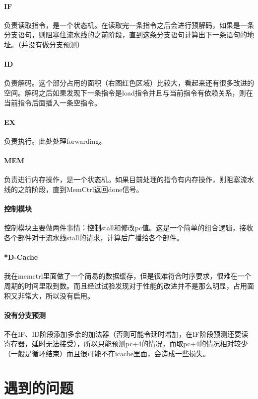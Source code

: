 \documentclass[UTF8]{ctexart}
\begin{document}
	
	\paragraph{IF} 负责读取指令，是一个状态机。在读取完一条指令之后会进行预解码，如果是一条分支语句，则阻塞住流水线的之前阶段，直到这条分支语句计算出下一条语句的地址。（并没有做分支预测）
	
	
	\paragraph{ID} 负责解码。这个部分占用的面积（右图红色区域）比较大，看起来还有很多改进的空间。解码之后如果发现下一条指令是load指令并且与当前指令有依赖关系，则在当前指令后面插入一条空指令。
	

	
	\paragraph{EX} 负责执行。此处处理forwarding。
	\paragraph{MEM} 负责进行内存操作，是一个状态机。如果目前处理的指令有内存操作，则阻塞流水线的之前阶段，直到MemCtrl返回done信号。
	\paragraph{控制模块} 控制模块主要做两件事情：控制stall和修改pc值。这是一个简单的组合逻辑，接收各个部件对于流水线stall的请求，计算后广播给各个部件。
	\paragraph{*D-Cache} 我在memctrl里面做了一个简易的数据缓存，但是很难符合时序要求，很难在一个周期的时间里取到数。而且经过试验发现对于性能的改进并不是那么明显，占用面积又非常大，所以没有启用。
	\paragraph{没有分支预测} 不在IF、ID阶段添加多余的加法器（否则可能令延时增加，在IF阶段预测还要读寄存器，延时无法接受），所以只能预测pc+4的情况，而取pc+4的情况相对较少（一般是循环结束）而且很可能不在icache里面，会造成一些损失。
	
\section{遇到的问题}
\end{document}
